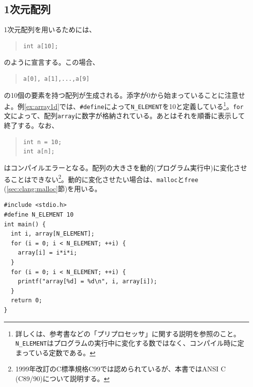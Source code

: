 \subsection{1次元配列}
1次元配列を用いるためには、
%
\begin{quote}
\begin{verbatim}
int a[10];
\end{verbatim}
\end{quote}
%
のように宣言する。この場合、
\begin{quote}
\begin{verbatim}
a[0], a[1],...,a[9]
\end{verbatim}
\end{quote}
%
の10個の要素を持つ配列が生成される。添字が0から始まっていることに注意せよ。例\ref{ex:array1d}では、\verb|#define|によって\verb|N_ELEMENT|を10と定義している\footnote{詳しくは、参考書などの「プリプロセッサ」に関する説明を参照のこと。{\tt N\_ELEMENT}はプログラムの実行中に変化する数ではなく、コンパイル時に定まっている定数である。}。\verb|for|文によって、配列\verb|array|に数字が格納されている。あとはそれを順番に表示して終了する。なお、
%
\begin{quote}
\begin{verbatim}
int n = 10;
int a[n];
\end{verbatim}
\end{quote}
%
はコンパイルエラーとなる。配列の大きさを動的(プログラム実行中)に変化させることはできない\footnote{1999年改訂のC標準規格C99では認められているが、本書ではANSI C (C89/90)について説明する。}。動的に変化させたい場合は、\verb|malloc|と\verb|free| (\ref{sec:clang:malloc}節)を用いる。
%
\begin{reidai}\label{ex:array1d}
\begin{verbatim}
#include <stdio.h>
#define N_ELEMENT 10
int main() {
  int i, array[N_ELEMENT];
  for (i = 0; i < N_ELEMENT; ++i) {
    array[i] = i*i*i;
  }
  for (i = 0; i < N_ELEMENT; ++i) {
    printf("array[%d] = %d\n", i, array[i]);
  }
  return 0;
}
\end{verbatim}
\end{reidai}
%


